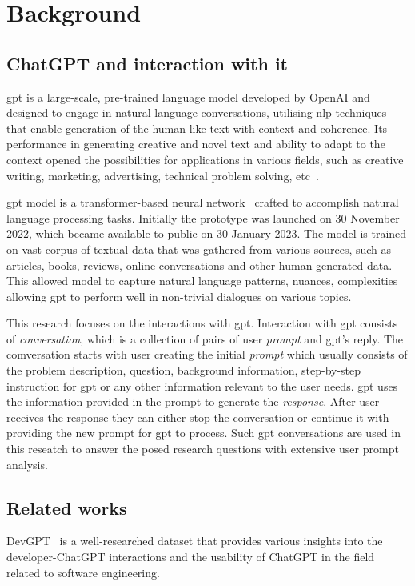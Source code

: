 \chapter{Background}
\section{ChatGPT and interaction with it}
\gls{gpt} is a large-scale, pre-trained language model developed by OpenAI and designed to engage in natural language conversations, utilising \gls{nlp} techniques that enable generation of the human-like text with context and coherence. Its performance in generating creative and novel text and ability to adapt to the context opened the possibilities for applications in various fields, such as creative writing, marketing, advertising, technical problem solving, etc~\cite{fi15060192}. 

\gls{gpt} model is a transformer-based neural network~\cite{vaswani2017attention} crafted to accomplish natural language processing tasks. Initially the prototype was launched on 30 November 2022, which became available to public on 30 January 2023. The model is trained on vast corpus of textual data that was gathered from various sources, such as articles, books, reviews, online conversations and other human-generated data. This allowed model to capture natural language patterns, nuances, complexities allowing \gls{gpt} to perform well in non-trivial dialogues on various topics. 

This research focuses on the interactions with \gls{gpt}. Interaction with \gls{gpt} consists of \textit{conversation}, which is a collection of pairs of user \textit{prompt} and \gls{gpt}'s reply. The comversation starts with user creating the initial \textit{prompt} which usually consists of the problem description, question, background information, step-by-step instruction for \gls{gpt} or any other information relevant to the user needs. \gls{gpt} uses the information provided in the prompt to generate the \textit{response}. After user receives the response they can either stop the conversation or continue it with providing the new prompt for \gls{gpt} to process. Such \gls{gpt} conversations are used in this reseatch to answer the posed research questions with extensive user prompt analysis.

\section{Related works} \label{related-work}
DevGPT~\cite{devgpt} is a well-researched dataset that provides various insights into the developer-ChatGPT interactions and the usability of ChatGPT in the field related to software engineering. 

